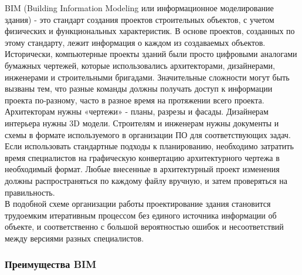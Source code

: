 \documentclass[a4paper,14pt]{extreport} %
\begin{document}
BIM (Building Information Modeling или информационное моделирование здания) - это стандарт создания проектов строительных объектов, с учетом физических и функциональных характеристик. В основе проектов, созданных по этому стандарту, лежит информация о каждом из создаваемых объектов. \\
Исторически, компьютерные проекты зданий были просто цифровыми аналогами бумажных чертежей, которые использовались архитекторами, дизайнерами, инженерами и строительными бригадами. 
Значительные сложности могут быть вызваны тем, что разные команды должны получать доступ к информации проекта по-разному, часто в разное время на протяжении всего проекта. \\
Архитекторам нужны «чертежи» - планы, разрезы и фасады. Дизайнерам интерьера нужны 3D модели. Строителям и инженерам нужны документы и схемы в формате используемого в организации ПО для соответствующих задач. Если использовать стандартные подходы к планированию, необходимо затратить время специалистов на графическую конвертацию архитектурного чертежа в необходимый формат. Любые внесенные в архитектурный проект изменения должны распространяться по каждому файлу вручную, и затем проверяться на правильность. \\
В подобной схеме организации работы проектирование здания становится трудоемким итеративным процессом без единого источника информации об объекте, и соответственно с большой вероятностью ошибок и несоответствий между версиями разных специалистов.
\subsubsection{Преимущества BIM}
\end{document}
